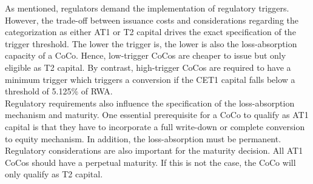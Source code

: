 As mentioned, regulators demand the implementation of regulatory triggers. However, the trade-off between issuance costs and considerations regarding the categorization as either AT1 or T2 capital drives the exact specification of the trigger threshold. The lower the trigger is, the lower is also the loss-absorption capacity of a CoCo. Hence, low-trigger CoCos are cheaper to issue but only eligible as T2 capital. By contrast, high-trigger CoCos are required to have a minimum trigger which triggers a conversion if the CET1 capital falls below a threshold of 5.125\% of RWA. \citep{avdjiev2013cocos}\\

Regulatory requirements also influence the specification of the loss-absorption mechanism and maturity. One essential prerequisite for a CoCo to qualify as AT1 capital is that they have to incorporate a full write-down or complete conversion to equity mechanism. \citep{RePEc:zbw:bubdps:282014} In addition, the loss-absorption must be permanent. Regulatory considerations are also important for the maturity decision. All AT1 CoCos should have a perpetual maturity. If this is not the case, the CoCo will only qualify as T2 capital. \citep{avdjiev2013cocos}